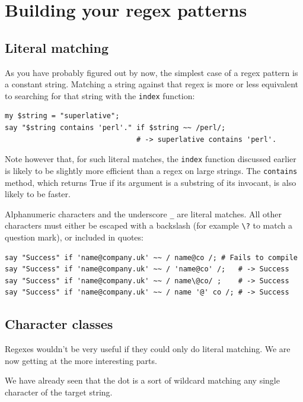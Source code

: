 \section{Building your regex patterns}
\label{pattern}

\subsection{Literal matching}

As you have probably figured out by now, the simplest case 
of a regex pattern is a constant string. Matching a string 
against that regex is more or less equivalent to searching 
for that string with the {\tt index} function:

\begin{verbatim}
my $string = "superlative";
say "$string contains 'perl'." if $string ~~ /perl/;
                               # -> superlative contains 'perl'.
\end{verbatim}
%

Note however that, for such literal matches, the {\tt index} 
function discussed earlier is likely to be slightly more 
efficient than a regex on large strings. The {\tt contains} 
method, which returns True if its argument is a substring of 
its invocant, is also likely to be faster.

Alphanumeric characters and the underscore \verb'_' are literal 
matches. All other characters must either be escaped with a 
backslash (for example \verb'\?' to match a question mark), 
or included in quotes:

\begin{verbatim}
say "Success" if 'name@company.uk' ~~ / name@co /; # Fails to compile
say "Success" if 'name@company.uk' ~~ / 'name@co' /;   # -> Success
say "Success" if 'name@company.uk' ~~ / name\@co/ ;    # -> Success
say "Success" if 'name@company.uk' ~~ / name '@' co /; # -> Success
\end{verbatim}
%


\subsection{Character classes}

Regexes wouldn't be very useful if they could only do literal 
matching. We are now getting at the more interesting parts.

We have already seen that the dot is a sort of wildcard 
matching any single character of the target string. 

